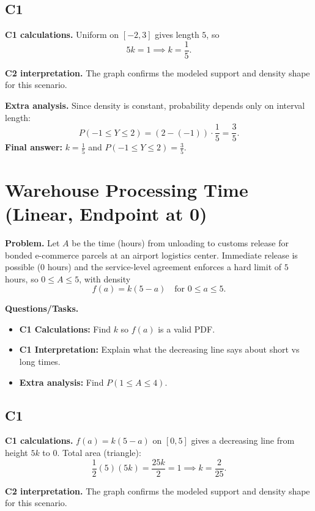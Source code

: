 	\subsection*{C1}

\textbf{C1 calculations.}
Uniform on $[-2,3]$ gives length $5$, so
	\[
	5k=1\implies k=\frac15.
	\]

\textbf{C2 interpretation.}
The graph confirms the modeled support and density shape for this scenario.

\textbf{Extra analysis.}
Since density is constant, probability depends only on interval length:
\[
P(-1\le Y\le2)=(2-(-1))\cdot\frac15=\frac35.
\]
\textbf{Final answer:} $k=\frac15$ and $P(-1\le Y\le2)=\frac35$.
	\section{Warehouse Processing Time (Linear, Endpoint at 0)}
	
	\textbf{Problem.}
	Let $A$ be the time (hours) from unloading to customs release for bonded e-commerce parcels at an airport logistics center. Immediate release is possible ($0$ hours) and the service-level agreement enforces a hard limit of $5$ hours, so $0\le A\le 5$, with density
	\[
	f(a)=k(5-a)\quad\text{for }0\le a\le 5.
	\]
	
	\textbf{Questions/Tasks.}
	\begin{itemize}
		\item \textbf{C1 Calculations:} Find $k$ so $f(a)$ is a valid PDF.
		\item \textbf{C1 Interpretation:} Explain what the decreasing line says about short vs long times.
		\item \textbf{Extra analysis:} Find $P(1\le A\le 4)$.
	\end{itemize}

	\subsection*{C1}

\textbf{C1 calculations.}
$f(a)=k(5-a)$ on $[0,5]$ gives a decreasing line from height $5k$ to $0$.
	Total area (triangle):
	\[
	\frac12(5)(5k)=\frac{25k}{2}=1\implies k=\frac{2}{25}.
	\]

\textbf{C2 interpretation.}
The graph confirms the modeled support and density shape for this scenario.

